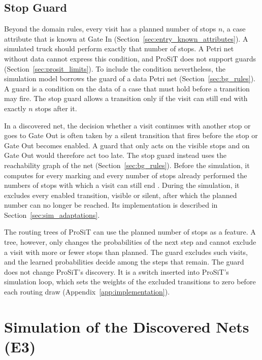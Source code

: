 \subsection{Stop Guard}
\label{sec:exp_guard}
Beyond the domain rules, every visit has a planned number of stops $n$, a case
attribute that is known at Gate In (Section~\ref{sec:entry_known_attributes}). A
simulated truck should perform exactly that number of stops. A Petri net without
data cannot express this condition, and ProSiT does not support guards
(Section~\ref{sec:prosit_limits}). To include the condition nevertheless, the
simulation model borrows the guard of a data Petri net
(Section~\ref{sec:bg_rules}). A guard is a condition on the data of a case that
must hold before a transition may fire. The stop guard allows a transition only if
the visit can still end with exactly $n$ stops after it.

In a discovered net, the decision whether a visit continues with another stop or
goes to Gate Out is often taken by a silent transition that fires before the stop
or Gate Out becomes enabled. A guard that only acts on the visible stops and on
Gate Out would therefore act too late. The stop guard instead uses the reachability
graph of the net (Section~\ref{sec:bg_rules}). Before the simulation, it computes
for every marking and every number of stops already performed the numbers of stops
with which a visit can still end \cite{FelliDeLeoniMontali2021}. During the
simulation, it excludes every enabled transition, visible or silent, after which the
planned number can no longer be reached. Its implementation is described in
Section~\ref{sec:sim_adaptations}.

The routing trees of ProSiT can use the planned number of stops as a feature. A
tree, however, only changes the probabilities of the next step and cannot exclude a
visit with more or fewer stops than planned. The guard excludes such visits, and the
learned probabilities decide among the steps that remain. The guard does not change
ProSiT's discovery. It is a switch inserted into ProSiT's simulation loop, which sets
the weights of the excluded transitions to zero before each routing draw
(Appendix~\ref{app:implementation}).

\section{Simulation of the Discovered Nets (E3)}
\label{sec:exp_baseline}

